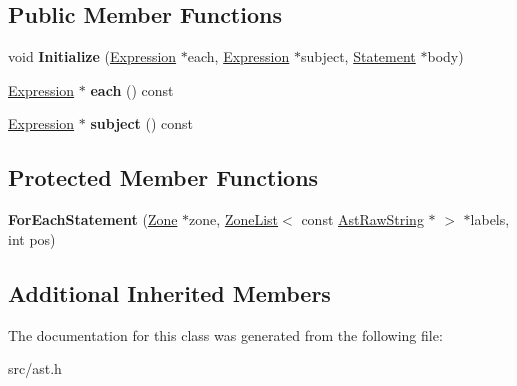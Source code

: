 \subsection*{Public Member Functions}
\begin{DoxyCompactItemize}
\item 
\hypertarget{classv8_1_1internal_1_1_for_each_statement_a313c15cf34ee25e46b38d29f98e2062c}{}void {\bfseries Initialize} (\hyperlink{classv8_1_1internal_1_1_expression}{Expression} $\ast$each, \hyperlink{classv8_1_1internal_1_1_expression}{Expression} $\ast$subject, \hyperlink{classv8_1_1internal_1_1_statement}{Statement} $\ast$body)\label{classv8_1_1internal_1_1_for_each_statement_a313c15cf34ee25e46b38d29f98e2062c}

\item 
\hypertarget{classv8_1_1internal_1_1_for_each_statement_a15dbcb73f9077dbad09fb8c3c945adda}{}\hyperlink{classv8_1_1internal_1_1_expression}{Expression} $\ast$ {\bfseries each} () const \label{classv8_1_1internal_1_1_for_each_statement_a15dbcb73f9077dbad09fb8c3c945adda}

\item 
\hypertarget{classv8_1_1internal_1_1_for_each_statement_af3cbbe56941d9c7c8f83456e3ee9189e}{}\hyperlink{classv8_1_1internal_1_1_expression}{Expression} $\ast$ {\bfseries subject} () const \label{classv8_1_1internal_1_1_for_each_statement_af3cbbe56941d9c7c8f83456e3ee9189e}

\end{DoxyCompactItemize}
\subsection*{Protected Member Functions}
\begin{DoxyCompactItemize}
\item 
\hypertarget{classv8_1_1internal_1_1_for_each_statement_abf06e12eaae648e6f694c45e1d8e60c9}{}{\bfseries For\+Each\+Statement} (\hyperlink{classv8_1_1internal_1_1_zone}{Zone} $\ast$zone, \hyperlink{classv8_1_1internal_1_1_zone_list}{Zone\+List}$<$ const \hyperlink{classv8_1_1internal_1_1_ast_raw_string}{Ast\+Raw\+String} $\ast$ $>$ $\ast$labels, int pos)\label{classv8_1_1internal_1_1_for_each_statement_abf06e12eaae648e6f694c45e1d8e60c9}

\end{DoxyCompactItemize}
\subsection*{Additional Inherited Members}


The documentation for this class was generated from the following file\+:\begin{DoxyCompactItemize}
\item 
src/ast.\+h\end{DoxyCompactItemize}
